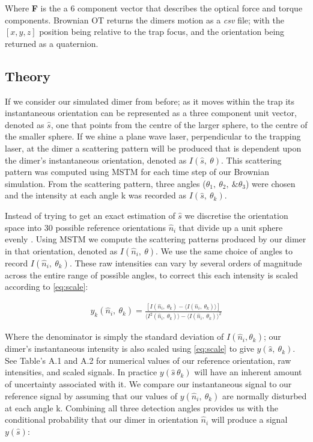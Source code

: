 \documentclass[final, 3p]{elsarticle}
\begin{document}
Where \textbf{F} is the a 6 component vector that describes the optical force and torque components. Brownian OT returns the dimers motion as a \textit{csv} file; with the $[x,y,z]$ position being relative to the trap focus, and the orientation being returned as a quaternion. 

\subsection{Theory}
\label{sec:2.2}

If we consider our simulated dimer from before; as it moves within the trap its instantaneous orientation can be represented as a three component unit vector, denoted as $\hat{s}$, one that points from the centre of the larger sphere, to the centre of the smaller sphere. If we shine a plane wave laser, perpendicular to the trapping laser, at the dimer a scattering pattern will be produced that is dependent upon the dimer's instantaneous orientation, denoted as $I(\hat{s},\ \theta)$. This scattering pattern was computed using MSTM for each time step of our Brownian simulation. From the scattering pattern, three angles ($\theta_1,\ \theta_2,\ \& \theta_3$) were chosen and the intensity at each angle k was recorded as $I(\hat{s},\ \theta_k)$. 

Instead of trying to get an exact estimation of $\hat{s}$ we discretise the orientation space into 30 possible reference orientations $\hat{n}_i$ that divide up a unit sphere evenly \cite{Rey2006}. Using MSTM we compute the scattering patterns produced by our dimer in that orientation, denoted as $I(\hat{n}_i, \ \theta)$. We use the same choice of angles to record $I(\hat{n}_i, \ \theta_k)$. These raw intensities can vary by several orders of magnitude across the entire range of possible angles, to correct this each intensity is scaled according to \eqref{eq:scale}:

\begin{align}
	\label{eq:scale}
	y_k(\hat{n}_i,\ \theta_k) = 
	 \frac{\left[I(\hat{n}_i, \ \theta_k)- \langle I(\hat{n}_i, \ \theta_k) \rangle \right]} 
	{\langle I^2(\hat{n}_i,\ \theta_k) \rangle -\langle I(\hat{n}_i, \ \theta_k)\rangle^2}
\end{align}

Where the denominator is simply the standard deviation of $I(\hat{n}_i, \theta_k)$; our dimer's instantaneous intensity is also scaled using \eqref{eq:scale} to give $y(\hat{s},\ \theta_k)$. See Table's A.1 and A.2 for numerical values of our reference orientation, raw intensities, and scaled signals. In practice $y(\hat{s}\, \theta_k)$ will have an inherent amount of uncertainty associated with it. We compare our instantaneous signal to our reference signal by assuming that our values of $y(\hat{n}_i,\ \theta_k)$ are normally disturbed at each angle k. Combining all three detection angles provides us with the conditional probability that our dimer in orientation $\hat{n}_i$ will produce a signal $y(\hat{s})$: 
\end{document}
